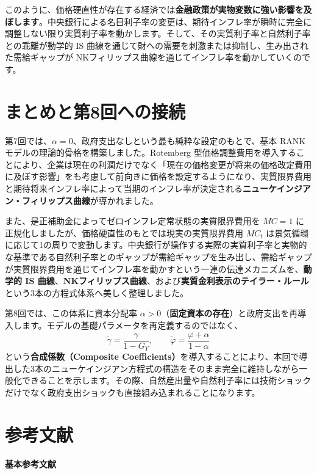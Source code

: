 \documentclass[
  japanese,
  lualatex,
  ja=standard,
  12pt,
  a4paper]{ltjsarticle}
\begin{document}
このように、価格硬直性が存在する経済では\textbf{金融政策が実物変数に強い影響を及ぼします}。中央銀行による名目利子率の変更は、期待インフレ率が瞬時に完全に調整しない限り実質利子率を動かします。そして、その実質利子率と自然利子率との乖離が動学的
IS 曲線を通じて財への需要を刺激または抑制し、生み出された需給ギャップが
NKフィリップス曲線を通じてインフレ率を動かしていくのです。

\section{まとめと第8回への接続}\label{ux307eux3068ux3081ux3068ux7b2c8ux56deux3078ux306eux63a5ux7d9a}

第7回では、\(\alpha=0\)、政府支出なしという最も純粋な設定のもとで、基本
RANK モデルの理論的骨格を構築しました。Rotemberg
型価格調整費用を導入することにより、企業は現在の利潤だけでなく「現在の価格変更が将来の価格改定費用に及ぼす影響」をも考慮して前向きに価格を設定するようになり、実質限界費用と期待将来インフレ率によって当期のインフレ率が決定される\textbf{ニューケインジアン・フィリップス曲線}が導かれました。

また、是正補助金によってゼロインフレ定常状態の実質限界費用を \(MC=1\)
に正規化しましたが、価格硬直性のもとでは現実の実質限界費用 \(MC_t\)
は景気循環に応じて1の周りで変動します。中央銀行が操作する実際の実質利子率と実物的な基準である自然利子率とのギャップが需給ギャップを生み出し、需給ギャップが実質限界費用を通じてインフレ率を動かすという一連の伝達メカニズムを、\textbf{動学的
IS
曲線}、\textbf{NKフィリップス曲線}、および\textbf{実質金利表示のテイラー・ルール}という3本の方程式体系へ美しく整理しました。

第8回では、この体系に資本分配率
\(\alpha>0\)（\textbf{固定資本の存在}）と政府支出を再導入します。モデルの基礎パラメータを再定義するのではなく、
\[
\tilde{\gamma}=\frac{\gamma}{1-G_Y},
\qquad
\tilde{\varphi}=\frac{\varphi+\alpha}{1-\alpha}
\] という\textbf{合成係数（Composite
Coefficients）}を導入することにより、本回で導出した3本のニューケインジアン方程式の構造をそのまま完全に維持しながら一般化できることを示します。その際、自然産出量や自然利子率には技術ショックだけでなく政府支出ショックも直接組み込まれることになります。

\Needspace{0.32\textheight}

\section{参考文献}\label{ux53c2ux8003ux6587ux732e}

\textbf{基本参考文献}
\end{document}
